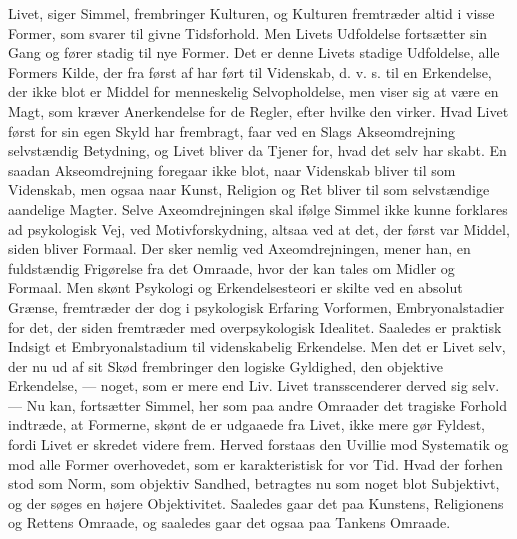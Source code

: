 \documentclass[12pt]{article}
\newcommand{\apage}[1]{\marginnote{\footnotesize\textit{[#1]}}}
\begin{document}
Livet, siger Simmel, frembringer Kulturen, og Kulturen fremtræder altid i visse
Former, som svarer til givne Tidsforhold. Men Livets Udfoldelse fortsætter sin
Gang og fører stadig til nye Former. Det er denne Livets stadige Udfoldelse,
alle Formers Kilde, der fra først af har ført til Videnskab, d. v. s. til en
Erkendelse, der ikke blot er Middel for menneskelig Selvopholdelse, men viser
sig at være en Magt, som kræver Anerkendelse for de Regler, efter hvilke den
virker. Hvad Livet først for sin egen Skyld har frembragt, faar ved en Slags
Akseomdrejning selvstændig Betydning, og Livet bliver da Tjener for, hvad det
selv har skabt. En saadan Akseomdrejning foregaar ikke blot, naar Videnskab
bliver til som Videnskab, men ogsaa naar Kunst, Religion og Ret bliver til som
selvstændige
\setcounter{footnote}{0}%
\apage{93}aandelige Magter. Selve
\guillemotright{}Axeomdrejningen\guillemotleft{} skal ifølge Simmel ikke kunne
forklares ad psykologisk Vej, ved Motivforskydning, altsaa ved at det, der
først var Middel, siden bliver Formaal. Der sker nemlig ved
\guillemotright{}Axeomdrejningen\guillemotleft{}, mener han, en fuldstændig
Frigørelse fra det Omraade, hvor der kan tales om Midler og Formaal. Men skønt
Psykologi og Erkendelsesteori er skilte ved en absolut Grænse, fremtræder der
dog i psykologisk Erfaring \guillemotright{}Vorformen\guillemotleft{},
Embryonalstadier for det, der siden fremtræder med
\guillemotright{}overpsykologisk Idealitet\guillemotleft{}. Saaledes er
praktisk Indsigt et Embryonalstadium til videnskabelig Erkendelse. Men det er
Livet selv, der nu ud af sit Skød frembringer den logiske Gyldighed, den
objektive Erkendelse, --- noget, som er mere end Liv. Livet transscenderer
derved sig selv. --- Nu kan, fortsætter Simmel, her som paa andre Omraader det
tragiske Forhold indtræde, at Formerne, skønt de er udgaaede fra Livet, ikke
mere gør Fyldest, fordi Livet er skredet videre frem. Herved forstaas den
Uvillie mod Systematik og mod alle Former overhovedet, som er karakteristisk
for vor Tid. Hvad der forhen stod som Norm, som objektiv Sandhed, betragtes nu
som noget blot Subjektivt, og der søges en højere Objektivitet. Saaledes gaar
det paa Kunstens, Religionens og Rettens Omraade, og saaledes gaar det ogsaa
paa Tankens Omraade.
\end{document}
